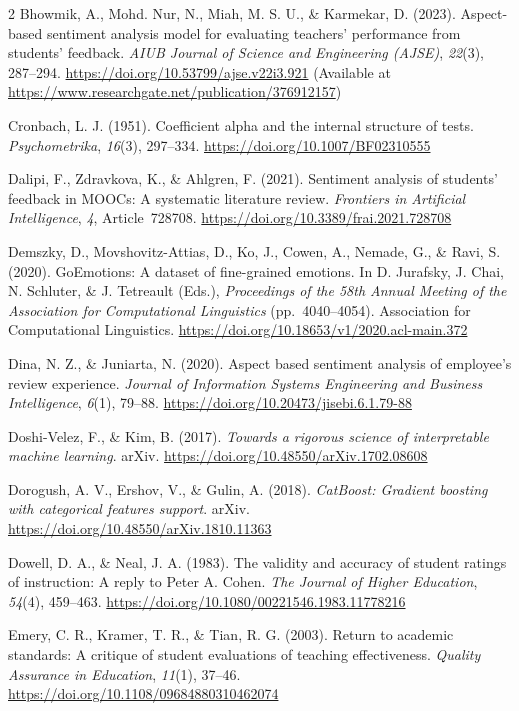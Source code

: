 \documentclass{article}
\begin{document}
\begin{multicols*}{2}
Bhowmik, A., Mohd. Nur, N., Miah, M. S. U., \& Karmekar, D. (2023). Aspect-based sentiment analysis model for evaluating teachers' performance from students' feedback. \textit{AIUB Journal of Science and Engineering (AJSE)}, \textit{22}(3), 287--294. \url{https://doi.org/10.53799/ajse.v22i3.921} (Available at \url{https://www.researchgate.net/publication/376912157})

Cronbach, L. J. (1951). Coefficient alpha and the internal structure of tests. \textit{Psychometrika}, \textit{16}(3), 297--334. \url{https://doi.org/10.1007/BF02310555}

‌Dalipi, F., Zdravkova, K., \& Ahlgren, F. (2021). Sentiment analysis of students' feedback in MOOCs: A systematic literature review. \textit{Frontiers in Artificial Intelligence}, \textit{4}, Article~728708. \url{https://doi.org/10.3389/frai.2021.728708}

Demszky, D., Movshovitz-Attias, D., Ko, J., Cowen, A., Nemade, G., \& Ravi, S. (2020). GoEmotions: A dataset of fine-grained emotions. In D. Jurafsky, J. Chai, N. Schluter, \& J. Tetreault (Eds.), \textit{Proceedings of the 58th Annual Meeting of the Association for Computational Linguistics} (pp.~4040--4054). Association for Computational Linguistics. \url{https://doi.org/10.18653/v1/2020.acl-main.372}

Dina, N. Z., \& Juniarta, N. (2020). Aspect based sentiment analysis of employee's review experience. \textit{Journal of Information Systems Engineering and Business Intelligence}, \textit{6}(1), 79--88. \url{https://doi.org/10.20473/jisebi.6.1.79-88}

Doshi-Velez, F., \& Kim, B. (2017). \textit{Towards a rigorous science of interpretable machine learning}. arXiv. \url{https://doi.org/10.48550/arXiv.1702.08608}

Dorogush, A. V., Ershov, V., \& Gulin, A. (2018). \textit{CatBoost: Gradient boosting with categorical features support}. arXiv. \url{https://doi.org/10.48550/arXiv.1810.11363}

Dowell, D. A., \& Neal, J. A. (1983). The validity and accuracy of student ratings of instruction: A reply to Peter A. Cohen. \textit{The Journal of Higher Education}, \textit{54}(4), 459--463. \url{https://doi.org/10.1080/00221546.1983.11778216}

Emery, C. R., Kramer, T. R., \& Tian, R. G. (2003). Return to academic standards: A critique of student evaluations of teaching effectiveness. \textit{Quality Assurance in Education}, \textit{11}(1), 37--46. \url{https://doi.org/10.1108/09684880310462074}


\end{multicols*}
\end{document}
